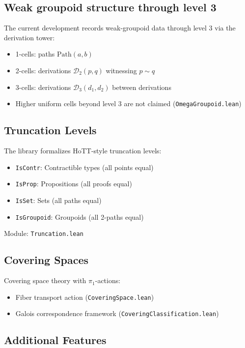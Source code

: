 \documentclass{lmcs}
\theoremstyle{definition}
\theoremstyle{plain}
\theoremstyle{remark}
\newcommand{\RwEq}{\sim}
\newcommand{\Path}{\mathrm{Path}}
\newcommand{\piOne}{\pi_1}
\newcommand{\Der}{\mathcal{D}}
\begin{document}
\subsection{Weak groupoid structure through level 3}

The current development records weak-groupoid data through level 3 via the
derivation tower:
\begin{itemize}
    \item 1-cells: paths $\Path(a, b)$
    \item 2-cells: derivations $\Der_2(p, q)$ witnessing $p \RwEq q$
    \item 3-cells: derivations $\Der_3(d_1, d_2)$ between derivations
    \item Higher uniform cells beyond level 3 are not claimed
    (\texttt{OmegaGroupoid.lean})
\end{itemize}

\subsection{Truncation Levels}

The library formalizes HoTT-style truncation levels:
\begin{itemize}
    \item \texttt{IsContr}: Contractible types (all points equal)
    \item \texttt{IsProp}: Propositions (all proofs equal)
    \item \texttt{IsSet}: Sets (all paths equal)
    \item \texttt{IsGroupoid}: Groupoids (all 2-paths equal)
\end{itemize}
Module: \texttt{Truncation.lean}

\subsection{Covering Spaces}

Covering space theory with $\piOne$-actions:
\begin{itemize}
    \item Fiber transport action (\texttt{CoveringSpace.lean})
    \item Galois correspondence framework (\texttt{CoveringClassification.lean})
\end{itemize}

\subsection{Additional Features}
\end{document}
